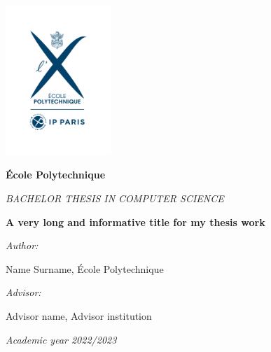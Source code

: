 \documentclass[oneside, a4paper, onecolumn, 10pt]{article}
\newcommand{\thesistitle}[0]{A very long and informative title for my thesis work}
\newcommand{\authorname}[0]{Name Surname}
\newcommand{\supervisor}[0]{Advisor name}
\newcommand{\supervisorinstitution}[0]{Advisor institution}
\begin{document}



\hspace{0pt}
\vfill

\begin{center}

\includegraphics[width=0.3\textwidth]{logo-EP-vertical}

\vspace*{2em}
%
{\large
\textbf{\'Ecole Polytechnique}

\vspace*{1em}
\textit{BACHELOR THESIS IN COMPUTER SCIENCE}


\vspace*{3em}
{\Huge \textbf{\thesistitle}}
\vspace*{3em}



\textit{Author:}

\vspace*{1em}
\authorname{}, \'Ecole Polytechnique

\vspace*{2em}
%
{\textit{Advisor:}}

\vspace*{1em}
\supervisor{}, \supervisorinstitution{}
}

\vspace*{2em}
\textit{Academic year 2022/2023}

\end{center}

\vfill
\hspace{0pt}
\end{document}
